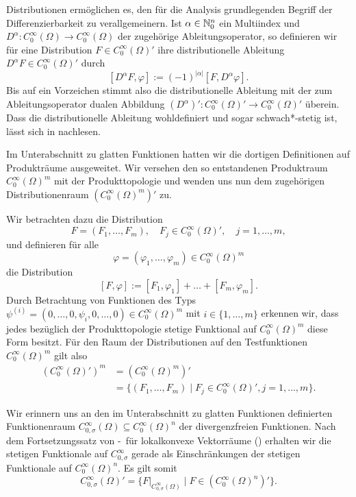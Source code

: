 Distributionen ermöglichen es, den für die Analysis grundlegenden Begriff der Differenzierbarkeit zu verallgemeinern.
Ist $\alpha \in \mathbb{N}_0^n$ ein Multiindex und $D^\alpha \colon C_0^\infty(\Omega) \to C_0^\infty(\Omega)$ der zugehörige Ableitungsoperator, so definieren wir für eine Distribution $F \in C_0^\infty(\Omega)'$ ihre distributionelle Ableitung $D^\alpha F \in C_0^\infty(\Omega)'$ durch
$$
  [D^\alpha F, \varphi] := (-1)^{|\alpha|} [F, D^\alpha \varphi].
$$
Bis auf ein Vorzeichen stimmt also die distributionelle Ableitung mit der zum Ableitungsoperator dualen Abbildung $(D^\alpha)' \colon C_0^\infty(\Omega)' \to C_0^\infty(\Omega)'$ überein.
Dass die distributionelle Ableitung wohldefiniert und sogar schwach*-stetig ist, lässt sich in \cite[S.434, Lemma VIII.5.7]{werner2011fa} nachlesen.

Im Unterabschnitt zu glatten Funktionen hatten wir die dortigen Definitionen auf Produkträume ausgeweitet.
Wir versehen den so entstandenen Produktraum $C_0^\infty(\Omega)^m$ mit der Produkttopologie und wenden uns nun dem zugehörigen Distributionenraum $(C_0^\infty(\Omega)^m)'$ zu.

Wir betrachten dazu die Distribution
$$
  F = (F_1, \dots, F_m), \quad F_j \in C_0^\infty(\Omega)', \quad j = 1, \dots, m,
$$
und definieren für alle 
$$\varphi = (\varphi_1, \dots, \varphi_m) \in C_0^\infty(\Omega)^m$$
die Distribution
\begin{equation}
  \label{eq:pairingVector}
  [F, \varphi] := [F_1, \varphi_1] + \dots + [F_m, \varphi_m].
\end{equation}
Durch Betrachtung von Funktionen des Typs $\psi^{(i)} = (0, \dots,0, \psi_i, 0,\dots,0) \in C_0^\infty(\Omega)^m$ mit $i \in \{1,\dots,m\}$ erkennen wir, dass jedes bezüglich der Produkttopologie stetige Funktional auf $C_0^\infty(\Omega)^m$ diese Form besitzt.
Für den Raum der Distributionen auf den Testfunktionen $C_0^\infty(\Omega)^m$ gilt also
\begin{align*}
  (C_0^\infty(\Omega)')^m 
  &= (C_0^\infty(\Omega)^m)' \\
  &= \{(F_1,\dots,F_m) \mid F_j \in C_0^\infty(\Omega)', j = 1, \dots,m\}.
\end{align*}

Wir erinnern uns an den im Unterabschnitt zu glatten Funktionen definierten Funktionenraum $C_{0, \sigma}^\infty(\Omega) \subseteq C_0^\infty(\Omega)^n$ der divergenzfreien Funktionen.
Nach dem Fortsetzungssatz von \hahn\hyp{}\banach\ für lokalkonvexe Vektorräume (\cite[S.408, Satz VIII.2.8]{werner2011fa}) erhalten wir die stetigen Funktionale auf $C_{0,\sigma}^\infty$ gerade als Einschränkungen der stetigen Funktionale auf $C_0^\infty(\Omega)^n$. 
Es gilt somit
$$
C_{0,\sigma}^\infty(\Omega)' = \{F|_{C_{0,\sigma}^\infty(\Omega)} \mid F \in (C_0^\infty(\Omega)^n)'\}.
$$

